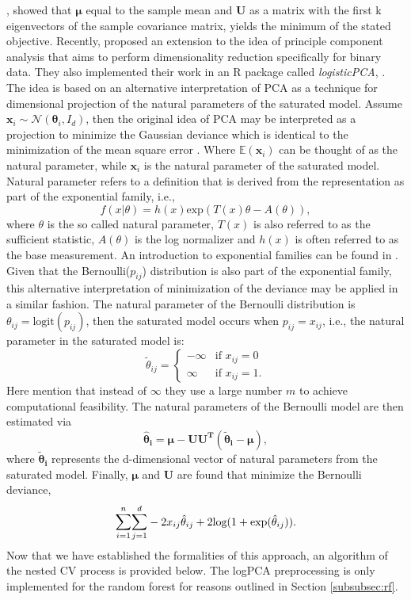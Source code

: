 \documentclass[a4paper,12pt, headsepline]{scrartcl}
\numberwithin{equation}{section}
\begin{document}
\citet{pearson01}, showed that $\bm \mu$ equal to the sample mean and $\bm U$ as a matrix with the first k eigenvectors of the sample covariance matrix, yields the minimum of the stated objective. Recently, \citet{landgraf2020} proposed an extension to the idea of principle component analysis that aims to perform dimensionality reduction specifically for binary data. They also implemented their work in an R package called \textit{logisticPCA}, \citet{logPCA}. The idea is based on an alternative interpretation of PCA as a technique for dimensional projection of the natural parameters of the saturated model. Assume $\bm x_{i} \sim \mathcal{N}(\bm \theta_i, I_d)$, then the original idea of PCA may be interpreted as a projection to minimize the Gaussian deviance which is identical to the minimization of the mean square error  \citep{collins01}. Where $\mathbb{E}(\bm x_i)$ can be thought of as the natural parameter, while $\bm x_i$ is the natural parameter of the saturated model. Natural parameter refers to a definition that is derived from the representation as part of the exponential family, i.e., 
\[
f(x|\theta) = h(x) \text{exp}(T(x)\theta-A(\theta)),
\]
where $\theta$ is the so called natural parameter, $T(x)$ is also referred to as the sufficient statistic, $A(\theta)$ is the log normalizer and $h(x)$ is often referred to as the base measurement. An introduction to exponential families can be found in \citet{case01}. Given that the Bernoulli($p_{ij}$) distribution is also part of the exponential family, this alternative interpretation of minimization of the deviance may be applied in a similar fashion. The natural parameter of the Bernoulli distribution is $\theta_{ij} = \text{logit}(p_{ij})$, then the saturated model occurs when $p_{ij} = x_{ij}$, i.e., the natural parameter in the saturated model is:
\begin{equation}
	\tilde{\theta}_{ij} =
	\begin{cases}
		-\infty & \text{if } x_{ij} = 0\\
		\infty & \text{if } x_{ij} = 1.
	\end{cases} 
\end{equation}
Here \citet{landgraf2020} mention that instead of $\infty$ they use a large number $m$ to achieve computational feasibility. The natural parameters of the Bernoulli model are then estimated via
\[
\bm{\hat \theta_i} =  \bm{\mu - UU^T(\tilde{\theta}_i-\mu)},
\]
where $\bm{\tilde{\theta}_i}$ represents the d-dimensional vector of natural parameters from the saturated model. Finally, $\bm \mu$ and $\bm U$ are found that minimize the Bernoulli deviance,
\[
 \mathlarger{\sum}\limits_{i = 1}^{n} \mathlarger{\sum}\limits_{j = 1}^{d} -2x_{ij}\hat{\theta}_{ij} + 2\text{log}(1 + \text{exp}(\hat{\theta}_{ij})).
\]
Now that we have established the formalities of this approach, an algorithm of the nested CV process is provided below. The logPCA preprocessing is only implemented for the random forest for reasons outlined in Section \ref{subsubsec:rf}.
\end{document}
